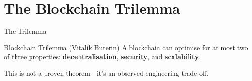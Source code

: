 \documentclass[10pt]{beamer}
\newcommand{\highlight}[1]{\textcolor{AccentOrange}{\textbf{#1}}}
\begin{document}
\section{The Blockchain Trilemma}

\begin{frame}{The Trilemma}
  \begin{block}{Blockchain Trilemma (Vitalik Buterin)}
    A blockchain can optimise for at most two of three properties: \highlight{decentralisation}, \highlight{security}, and \highlight{scalability}.
  \end{block}
  
  \vspace{1em}
  \begin{center}
  \end{center}
  
  \vspace{0.5em}
  This is not a proven theorem---it's an observed engineering trade-off.
\end{frame}
\end{document}
